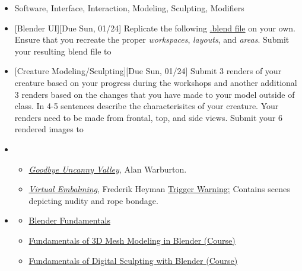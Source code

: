 \def\dMon{Mon, 01/18}
\def\dTues{Tues, 01/19}
\def\dWed{Wed, 01/20}
\def\dThur{Thur, 01/21}
\def\dFri{Fri, 01/22}
\def\dSat{Sat, 01/23}
\def\dSun{Sun, 01/24}
\placeDate

\begin{itemize}[noitemsep,topsep=0pt,leftmargin=*]
      \item {} Software, Interface, Interaction, Modeling, Sculpting, Modifiers
      \item {}[Blender UI][Due \dSun] Replicate the following \href{\#}{.blend file} on your own. Ensure that you recreate the proper \emph{workspaces}, \emph{layouts}, and \emph{areas}. Submit your resulting blend file to \discordE
      \item {}[Creature Modeling/Sculpting][Due \dSun] Submit 3 renders of your creature based on your progress during the workshops and another additional 3 renders based on the changes that you have made to your model outside of class. In 4-5 sentences describe the characterisitcs of your creature. Your renders need to be made from frontal, top, and side views. Submit your 6 rendered images to \discordE
      \item {}
            \begin{itemize}
                  \item \href{https://alanwarburton.co.uk/goodbye-uncanny-valley}{\emph{Goodbye Uncanny Valley}}, Alan Warburton.
                  \item \href{https://www.nowness.com/story/virtual-embalming-frederik-heyman}{\emph{Virtual Embalming}}, Frederik Heyman \newline
                        \small{\ul{Trigger Warning:} Contains scenes depicting nudity and rope bondage.}
            \end{itemize}
      \item {}
            \begin{resenv}
                  \begin{itemize}
                        \item \href{https://cloud.blender.org/p/blender-fundamentals/}{Blender Fundamentals}
                        \item \href{http://bit.ly/39jpRN5}{Fundamentals of 3D Mesh Modeling in Blender (Course)}
                        \item \href{http://bit.ly/38urSXu}{Fundamentals of Digital Sculpting with Blender (Course)}
                  \end{itemize}
            \end{resenv}
\end{itemize}
